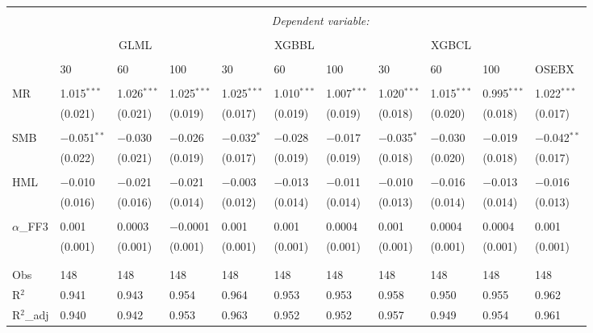 \begin{table}[H] \centering 
\footnotesize

\begin{tabularx}{\textwidth}{XXXX|XXX|XXX|l}
\\[-2ex]\hline 
\hline \\[-2ex] 
 & \multicolumn{10}{c}{\textit{Dependent variable:}} \\ 
\cline{2-11} 
\\[-2ex] 
 & \multicolumn{3}{c}{GLML} & \multicolumn{3}{c}{XGBBL} & \multicolumn{3}{c}{XGBCL} & \\
 \cline{2-10}
 \\[-1ex] 
 & 30 & 60 & 100 & 30 & 60 & 100 & 30 & 60 & 100 & OSEBX \\ 
 \cline{2-10} \\
 MR & 1.015$^{***}$ & 1.026$^{***}$ & 1.025$^{***}$ & 1.025$^{***}$ & 1.010$^{***}$ & 1.007$^{***}$ & 1.020$^{***}$ & 1.015$^{***}$ & 0.995$^{***}$ & 1.022$^{***}$ \\ 
  & (0.021) & (0.021) & (0.019) & (0.017) & (0.019) & (0.019) & (0.018) & (0.020) & (0.018) & (0.017) \\ 
   & & & & & & & & & & \\ 
 SMB & $-$0.051$^{**}$ & $-$0.030 & $-$0.026 & $-$0.032$^{*}$ & $-$0.028 & $-$0.017 & $-$0.035$^{*}$ & $-$0.030 & $-$0.019 & $-$0.042$^{**}$ \\ 
  & (0.022) & (0.021) & (0.019) & (0.017) & (0.019) & (0.019) & (0.018) & (0.020) & (0.018) & (0.017) \\ 
   & & & & & & & & & & \\ 
 HML & $-$0.010 & $-$0.021 & $-$0.021 & $-$0.003 & $-$0.013 & $-$0.011 & $-$0.010 & $-$0.016 & $-$0.013 & $-$0.016 \\ 
  & (0.016) & (0.016) & (0.014) & (0.012) & (0.014) & (0.014) & (0.013) & (0.014) & (0.014) & (0.013) \\ 
   & & & & & & & & & & \\ 
 $\alpha$_{FF3} & 0.001 & 0.0003 & $-$0.0001 & 0.001 & 0.001 & 0.0004 & 0.001 & 0.0004 & 0.0004 & 0.001 \\ 
  & (0.001) & (0.001) & (0.001) & (0.001) & (0.001) & (0.001) & (0.001) & (0.001) & (0.001) & (0.001) \\ 
   & & & & & & & & & & \\ 
\hline \\[-2ex] 
Obs & 148 & 148 & 148 & 148 & 148 & 148 & 148 & 148 & 148 & 148 \\ 
R$^{2}$ & 0.941 & 0.943 & 0.954 & 0.964 & 0.953 & 0.953 & 0.958 & 0.950 & 0.955 & 0.962 \\ 
R$^{2}$_{adj} & 0.940 & 0.942 & 0.953 & 0.963 & 0.952 & 0.952 & 0.957 & 0.949 & 0.954 & 0.961 \\ 


\end{tabularx}
\end{table}
